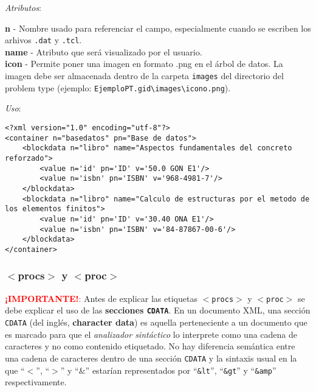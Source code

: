 \documentclass[10pt, a4paper, twocolumn]{article} %
\begin{document}
\vspace{0.15cm}
\textit{Atributos}:

\vspace{0.15cm}
	\textbf{n} - Nombre usado para referenciar el campo, especialmente cuando se escriben los arhivos \texttt{.dat} y \texttt{.tcl}.\\
	\textbf{name} - Atributo que será visualizado por el usuario.\\
	\textbf{icon} - Permite poner una imagen en formato .png en el árbol de datos. La imagen debe ser almacenada dentro de la carpeta \texttt{images} del directorio del problem type (ejemplo: \texttt{EjemploPT.gid\textbackslash images\textbackslash icono.png}).\\
\vspace{0.15cm}

\textit{Uso}:
\vspace{0.15cm}

\lstset{language=XML} 
\begin{lstlisting}[caption={Uso de <blockdata> para agrupar otros elementos.}]
<?xml version="1.0" encoding="utf-8"?>
<container n="basedatos" pn="Base de datos">
	<blockdata n="libro" name="Aspectos fundamentales del concreto reforzado">
		<value n='id' pn='ID' v='50.0 GON E1'/>
		<value n='isbn' pn='ISBN' v='968-4981-7'/>
	</blockdata>
	<blockdata n="libro" name="Calculo de estructuras por el metodo de los elementos finitos">
		<value n='id' pn='ID' v='30.40 ONA E1'/>
		<value n='isbn' pn='ISBN' v='84-87867-00-6'/>
	</blockdata>
</container>
\end{lstlisting}


\subsubsection{$<$procs$>$ y $<$proc$>$} \label{sec:calculararea}

\textcolor{red}{\textbf{¡IMPORTANTE!}:} Antes de explicar las etiquetas \texttt{$<$procs$>$} y \texttt{$<$proc$>$} se debe explicar el uso de las \textbf{secciones \texttt{CDATA}}. En un documento XML, una sección \texttt{CDATA} (del inglés, \textbf{character data}) es aquella perteneciente a un documento que es marcado para que el \textit{analizador sintáctico} lo interprete como una cadena de caracteres y no como contenido etiquetado. No hay diferencia semántica entre una cadena de caracteres dentro de una sección \texttt{CDATA} y la sintaxis usual en la que ``$<$'', ``$>$'' y ``$\&$'' estarían representados por ``\texttt{\&lt}'', ``\texttt{\&gt}'' y ``\texttt{\&amp}'' respectivamente.
\end{document}
